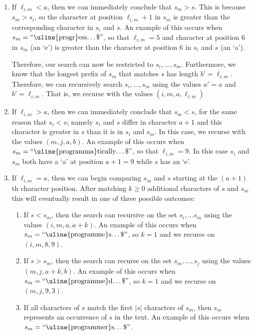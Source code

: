 \begin{enumerate}
\item If $\ell_{i,m}< a$, then we can immediately conclude that $s_m > s$. This is because $s_m > s_i$, so the character at position
$\ell_{i,m}+1$ in $s_m$ is greater than the corresponding character in $s_i$ and $s$.  An example of this occurs when $s_m=\text{``\uline{progr}ess\ldots\$''}$, so that $\ell_{i,m}=5$ and character at position 6 in $s_m$ (an `e') is greater than the character at position 6 in $s_i$ and $s$ (an `a').

Therefore, our search can now be restricted to $s_i,\ldots,s_{m}$.  Furthermore, we know that the longest prefix of $s_m$ that matches $s$ has length $b'=\ell_{i,m}$.  Therefore, we can recursively search $s_i,\ldots,s_{m}$ using the values $a'=a$ and $b'=\ell_{i,m}$. That is, we recurse with the values $(i,m,a,\ell_{i,m})$

\item If $\ell_{i,m} > a$, then we can immediately conclude that $s_m < s$, for the same reason that $s_i < s$; namely $s_i$ and $s$ differ in character $a+1$ and this character is greater in $s$ than it is in $s_i$ and $s_m$.
In this case, we recurse with the values $(m,j,a, b)$.
An example of this occurs when $s_m=\text{``\uline{programma}tically\ldots\$''}$, so that $\ell_{i,m}=9$. In this case $s_i$ and $s_m$ both have a `a' at position $a+1=9$ while $s$ has an `e'.

\item If $\ell_{i,m}= a$, then we can begin comparing $s_m$ and $s$ starting at the $(a+1)$th character position. After matching $k\ge0$ additional characters of $s$ and $s_m$ this will eventually result in one of three possible outcomes:
\begin{enumerate}
  \item If $s < s_m$, then the search can recursive on the set $s_i,\ldots s_m$ using the values $(i,m,a,a+k)$.  An example of this occurs when $s_m=\text{``\uline{programme}s\ldots\$''}$, so $k=1$ and we recurse on $(i,m,8,9)$.

  \item If $s > s_m$, then the search can recurse on the set $s_m,\ldots,s_j$ using the values $(m,j,a+k, b)$.  An example of this occurs when $s_m=\text{``\uline{programme}d\ldots\$''}$, so $k=1$ and we recurse on $(m,j,9,3)$.

  \item If all characters of $s$ match the first $|s|$ characters of $s_m$, then $s_m$ represents an occurrence of $s$ in the text.
  An example of this occurs when $s_m=\text{``\uline{programmer}s\ldots\$''}$.
\end{enumerate}
\end{enumerate}

